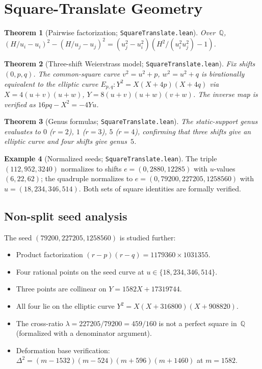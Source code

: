 \documentclass[11pt,a4paper]{article}
\newtheorem{theorem}{Theorem}[section]
\theoremstyle{definition}
\newtheorem{example}[theorem]{Example}
\theoremstyle{remark}
\newcommand{\QQ}{\mathbb{Q}}
\begin{document}
\section{Square-Translate Geometry}\label{sec:sq-translate}

\begin{theorem}[Pairwise factorization; \texttt{SquareTranslate.lean}]
Over~$\QQ$, $(H/u_i-u_i)^2-(H/u_j-u_j)^2 = (u_j^2-u_i^2)(H^2/(u_i^2u_j^2)-1)$.
\end{theorem}

\begin{theorem}[Three-shift Weierstrass model; \texttt{SquareTranslate.lean}]
Fix shifts $(0,p,q)$.  The common-square curve
$v^2=u^2+p$, $w^2=u^2+q$ is birationally equivalent to the elliptic curve
$E_{p,q}: Y^2 = X(X+4p)(X+4q)$
via $X=4(u+v)(u+w)$, $Y=8(u+v)(u+w)(v+w)$.
The inverse map is verified as $16pq-X^2 = -4Yu$.
\end{theorem}

\begin{theorem}[Genus formulas; \texttt{SquareTranslate.lean}]
The static-support genus evaluates to $0$ ($r=2$), $1$ ($r=3$), $5$ ($r=4$),
confirming that three shifts give an elliptic curve and four shifts give
genus~$5$.
\end{theorem}

\begin{example}[Normalized seeds; \texttt{SquareTranslate.lean}]
The triple $(112,952,3240)$ normalizes to shifts $e=(0,2880,12285)$
with $u$-values $(6,22,62)$; the quadruple normalizes to
$e=(0,79200,227205,1258560)$ with $u=(18,234,346,514)$.
Both sets of square identities are formally verified.
\end{example}

\subsection{Non-split seed analysis}

The seed $(79200,227205,1258560)$ is studied further:
\begin{itemize}[nosep]
\item Product factorization $(r-p)(r-q)=1179360\times 1031355$.
\item Four rational points on the seed curve at $u\in\{18,234,346,514\}$.
\item Three points are collinear on $Y=1582X+17319744$.
\item All four lie on the elliptic curve
      $Y^2=X(X+316800)(X+908820)$.
\item The cross-ratio $\lambda=227205/79200=459/160$ is not a perfect
      square in~$\QQ$ (formalized with a denominator argument).
\item Deformation base verification:
      $\Delta^2=(m-1532)(m-524)(m+596)(m+1460)$ at $m=1582$.
\end{itemize}
\end{document}
